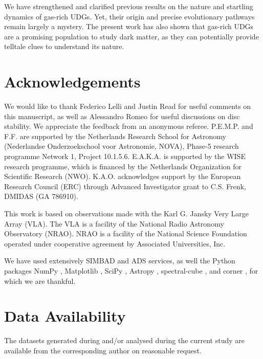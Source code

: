 \documentclass[fleqn,usenatbib]{mnras}
\begin{document}
We have strengthened and clarified previous results on the nature and startling dynamics of gas-rich UDGs. Yet, their origin and precise evolutionary pathways remain largely a mystery. The present work has also shown that gas-rich UDGs are a promising population to study dark matter, as they can potentially provide telltale clues to understand its nature.

\section*{Acknowledgements}
We would like to thank Federico Lelli and Justin Read for useful comments on this manuscript, as well as Alessandro Romeo for useful discussions on disc stability. We appreciate the feedback from an anonymous referee. P.E.M.P. and F.F. are supported by the Netherlands Research School for Astronomy (Nederlandse Onderzoekschool voor Astronomie, NOVA), Phase-5 research programme Network 1, Project 10.1.5.6. E.A.K.A. is supported by the WISE research programme, which is financed by the Netherlands Organization for Scientific Research (NWO). K.A.O. acknowledges support by the European Research Council (ERC) through Advanced Investigator grant to C.S. Frenk, DMIDAS (GA 786910).

This work is based on observations made with the Karl G. Jansky Very Large Array (VLA). The VLA is a facility of the National Radio Astronomy Observatory (NRAO). NRAO is a facility of the National Science Foundation operated under cooperative agreement by Associated Universities, Inc.

We have used extensively SIMBAD and ADS services, as well the Python packages NumPy \citep{numpy}, Matplotlib \citep{matplotlib}, SciPy \citep{scipy}, Astropy \citep{astropy}, spectral-cube \citep{spectral_cube}, and corner \citep{corner}, for which we are thankful.


\section*{Data Availability}
The datasets generated during and/or analysed during the current study are available from the corresponding author on reasonable request.
\end{document}
